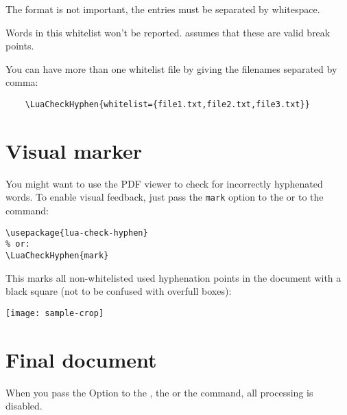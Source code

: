 \documentclass{ltxdockit}
\begin{document}
The format is not important, the entries must be separated by whitespace.

Words in this whitelist won't be reported.  assumes that these are valid break points.

You can have more than one whitelist file by giving the filenames separated by comma:

\begin{verbatim}
	\LuaCheckHyphen{whitelist={file1.txt,file2.txt,file3.txt}}
\end{verbatim}

\section{Visual marker}

You might want to use the PDF viewer to check for incorrectly hyphenated words. To enable visual feedback, just pass the \texttt{mark} option to the  or to the  command:

\begin{verbatim}
\usepackage{lua-check-hyphen}
% or:
\LuaCheckHyphen{mark}
\end{verbatim}

This marks all non-whitelisted used hyphenation points in the document with a black square (not to be confused with overfull boxes): 

\texttt{[image: sample-crop]}

\section{Final document}

When you pass the Option  to the , the  or the  command, all processing is disabled.
\end{document}
